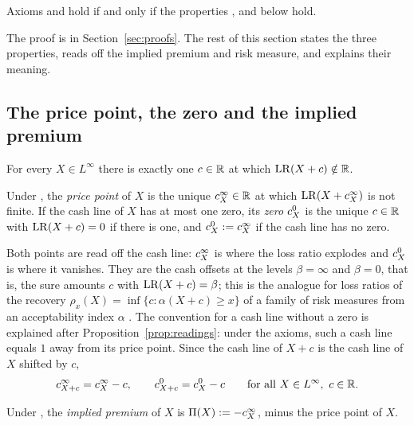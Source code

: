 \begin{proposition}\label{prop:RPNCM}
Axioms \axPe{} and \axR{} hold if and only if the properties \axP, \axN{} and \axCM{} below hold.
\end{proposition}

The proof is in Section~\ref{sec:proofs}. The rest of this section states the three properties, reads off the
implied premium and risk measure, and explains their meaning.

\subsection{The price point, the zero and the implied premium}\label{sec:implied-premium}

\begin{property}\label{ax:P}
For every $X\in L^\infty$ there is exactly one $c\in\mathbb R$ at which $\mathrm{LR}(X+c)\notin\mathbb R$.
\end{property}

\begin{definition}\label{def:points}
Under \axP, the \emph{price point} of $X$ is the unique $c^{\infty}_{X}\in\mathbb R$ at which $\mathrm{LR}(X+c^{\infty}_{X})$ is not finite.
If the cash line of $X$ has at most one zero, its \emph{zero} $c^{0}_{X}$ is the unique $c\in\mathbb R$ with
$\mathrm{LR}(X+c)=0$ if there is one, and $c^{0}_{X}:=c^{\infty}_{X}$ if the cash line has no zero.
\end{definition}

Both points are read off the cash line: $c^{\infty}_{X}$ is where the loss ratio explodes and $c^{0}_{X}$ is where it
vanishes. They are the cash offsets at the levels $\beta=\infty$ and $\beta=0$, that is, the sure amounts $c$ with
$\mathrm{LR}(X+c)=\beta$; this is the analogue for loss ratios of the recovery $\rho_x(X)=\inf\{c:\alpha(X+c)\ge x\}$ of a
family of risk measures from an acceptability index $\alpha$ \citep{chernymadan2009}. The convention for a cash line
without a zero is explained after Proposition~\ref{prop:readings}: under the axioms, such a cash line equals $1$
away from its price point. Since the cash line of $X+c$ is the cash line of $X$ shifted by $c$,
\begin{equation}\label{eq:pointscash}
 c^{\infty}_{X+c}=c^{\infty}_{X}-c,\qquad c^{0}_{X+c}=c^{0}_{X}-c\qquad\text{for all }X\in L^\infty,\ c\in\mathbb R .
\end{equation}

\begin{definition}\label{def:impliedprem}
Under \axP, the \emph{implied premium} of $X$ is $\Pi(X):=-c^{\infty}_{X}$, minus the price point of $X$.
\end{definition}

